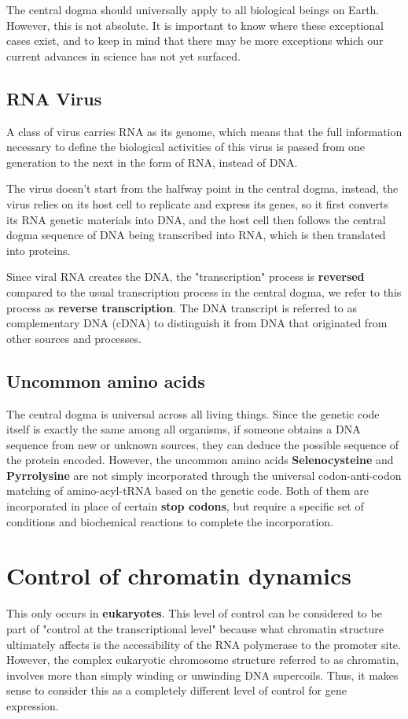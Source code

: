 \documentclass[11pt]{article}
\begin{document}
The central dogma should universally apply to all biological beings on Earth. However, this is not absolute. It is important to know where these exceptional cases exist, and to keep in mind that there may be more exceptions which our current advances in science has not yet surfaced.
\subsection{RNA Virus}
\label{sec:org5c4d61c}
A class of virus carries RNA as its genome, which means that the full information necessary to define the biological activities of this virus is passed from one generation to the next in the form of RNA, instead of DNA.


The virus doesn't start from the halfway point in the central dogma, instead, the virus relies on its host cell to replicate and express its genes, so it first converts its RNA genetic materials into DNA, and the host cell then follows the central dogma sequence of DNA being transcribed into RNA, which is then translated into proteins.


Since viral RNA creates the DNA, the "transcription" process is \textbf{reversed} compared to the usual transcription process in the central dogma, we refer to this process as \textbf{reverse transcription}. The DNA transcript is referred to as complementary DNA (cDNA) to distinguish it from DNA that originated from other sources and processes.
\subsection{Uncommon amino acids}
\label{sec:org5b1dda8}
The central dogma is universal across all living things. Since the genetic code itself is exactly the same among all organisms, if someone obtains a DNA sequence from new or unknown sources, they can deduce the possible sequence of the protein encoded. However, the uncommon amino acids \textbf{Selenocysteine} and \textbf{Pyrrolysine} are not simply incorporated through the universal codon-anti-codon matching of amino-acyl-tRNA based on the genetic code. Both of them are incorporated in place of certain \textbf{stop codons}, but require a specific set of conditions and biochemical reactions to complete the incorporation.
\section{Control of chromatin dynamics}
\label{sec:orgc4ce7fa}
This only occurs in \textbf{eukaryotes}. This level of control can be considered to be part of "control at the transcriptional level" because what chromatin structure ultimately affects is the accessibility of the RNA polymerase to the promoter site. However, the complex eukaryotic chromosome structure referred to as chromatin, involves more than simply winding or unwinding DNA supercoils. Thus, it makes sense to consider this as a completely different level of control for gene expression.
\end{document}
